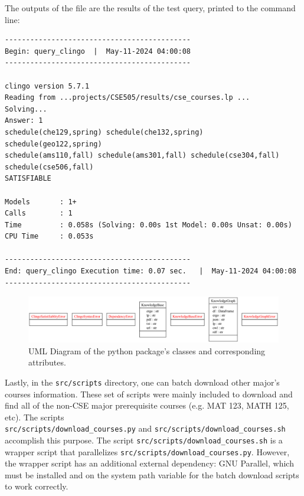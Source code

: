 \documentclass[12pt]{article}
\begin{document}
    \newpage 
    
    The outputs of the file are the results of the test query, printed to the command line: \\

    \begin{verbatim}
--------------------------------------------
Begin: query_clingo  |  May-11-2024 04:00:08
--------------------------------------------

clingo version 5.7.1
Reading from ...projects/CSE505/results/cse_courses.lp ...
Solving...
Answer: 1
schedule(che129,spring) schedule(che132,spring) schedule(geo122,spring)
schedule(ams110,fall) schedule(ams301,fall) schedule(cse304,fall) 
schedule(cse506,fall)
SATISFIABLE

Models       : 1+
Calls        : 1
Time         : 0.058s (Solving: 0.00s 1st Model: 0.00s Unsat: 0.00s)
CPU Time     : 0.053s

--------------------------------------------
End: query_clingo Execution time: 0.07 sec.   |  May-11-2024 04:00:08
--------------------------------------------
    \end{verbatim}

    \begin{figure}[h!]
        \centering
        \includegraphics[scale=0.4]{figures/uml/classes_src.png}
        \caption{UML Diagram of the python package's classes and corresponding attributes.}
        \label{fig:uml-classes}
    \end{figure}

    Lastly, in the {\tt{src/scripts}} directory, one can batch download other major's courses information. These set of scripts were mainly included to download and find all of the non-CSE major prerequisite courses (e.g. MAT 123, MATH 125, etc). The scripts \\ {\tt{src/scripts/download\_courses.py}} and {\tt{src/scripts/download\_courses.sh}} accomplish this purpose. The script {\tt{src/scripts/download\_courses.sh}} is a wrapper script that parallelizes {\tt{src/scripts/download\_courses.py}}. However, the wrapper script has an additional external dependency: GNU Parallel\cite{parallel2018}, which must be installed and on the system path variable for the batch download scripts to work correctly.
\end{document}
